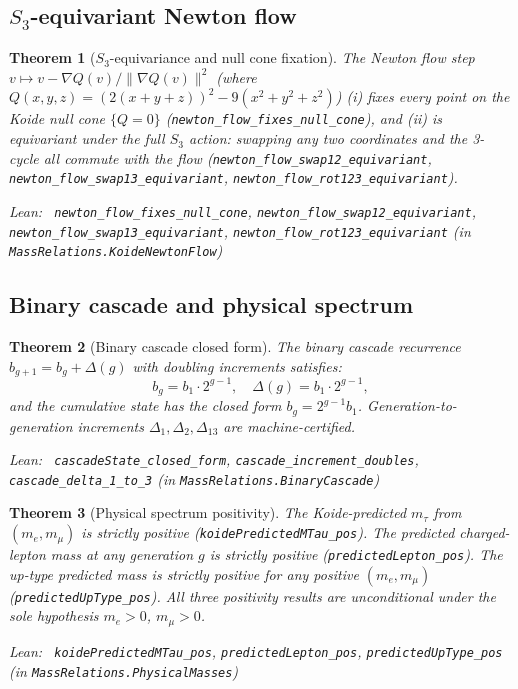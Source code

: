 \documentclass[11pt,a4paper]{article}
\newenvironment{leanref}%
  {\par\smallskip\noindent\begingroup\raggedright\textup{Lean:}~}%
  {\par\endgroup}
\newtheorem{theorem}{Theorem}[section]
\theoremstyle{definition}
\begin{document}
\subsection{$S_3$-equivariant Newton flow}

\begin{theorem}[$S_3$-equivariance and null cone fixation]\label{thm:newton-s3}
The Newton flow step $v \mapsto v - \nabla Q(v) / \|\nabla Q(v)\|^2$
(where $Q(x,y,z) = (2(x+y+z))^2 - 9(x^2+y^2+z^2)$)
(i) fixes every point on the Koide null cone $\{Q = 0\}$
(\lstinline|newton_flow_fixes_null_cone|), and
(ii) is equivariant under the full $S_3$ action: swapping any two
coordinates and the 3-cycle all commute with the flow
(\lstinline|newton_flow_swap12_equivariant|,
\lstinline|newton_flow_swap13_equivariant|,
\lstinline|newton_flow_rot123_equivariant|).

\begin{leanref} \lstinline|newton_flow_fixes_null_cone|,
\lstinline|newton_flow_swap12_equivariant|,
\lstinline|newton_flow_swap13_equivariant|,
\lstinline|newton_flow_rot123_equivariant|
\textup{(in \texttt{MassRelations.KoideNewtonFlow})}
\end{leanref}
\end{theorem}

\subsection{Binary cascade and physical spectrum}

\begin{theorem}[Binary cascade closed form]\label{thm:cascade}
The binary cascade recurrence $b_{g+1} = b_g + \Delta(g)$ with
doubling increments satisfies:
\[
  b_g = b_1 \cdot 2^{g-1}, \quad \Delta(g) = b_1 \cdot 2^{g-1},
\]
and the cumulative state has the closed form $b_g = 2^{g-1} b_1$.
Generation-to-generation increments $\Delta_1, \Delta_2, \Delta_{13}$
are machine-certified.

\begin{leanref} \lstinline|cascadeState_closed_form|,
\lstinline|cascade_increment_doubles|,
\lstinline|cascade_delta_1_to_3|
\textup{(in \texttt{MassRelations.BinaryCascade})}
\end{leanref}
\end{theorem}

\begin{theorem}[Physical spectrum positivity]\label{thm:spectrum-pos}
The Koide-predicted $m_\tau$ from $(m_e, m_\mu)$ is strictly positive
(\lstinline|koidePredictedMTau_pos|).
The predicted charged-lepton mass at any generation $g$ is strictly
positive (\lstinline|predictedLepton_pos|).
The up-type predicted mass is strictly positive for any positive $(m_e, m_\mu)$
(\lstinline|predictedUpType_pos|).
All three positivity results are unconditional under the sole hypothesis
$m_e > 0$, $m_\mu > 0$.

\begin{leanref} \lstinline|koidePredictedMTau_pos|,
\lstinline|predictedLepton_pos|, \lstinline|predictedUpType_pos|
\textup{(in \texttt{MassRelations.PhysicalMasses})}
\end{leanref}
\end{theorem}
\end{document}
